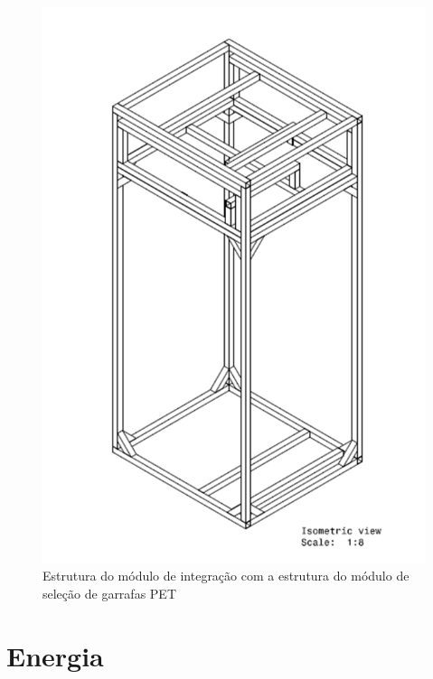 \begin{anexosenv}
\begin{figure}[!ht]
	\centering
		\includegraphics[scale=0.6]{figuras/estrutura/anexos/20.png}
	\caption{Estrutura do módulo de integração com a estrutura do módulo de seleção de garrafas PET}
\end{figure}

\chapter{Energia}


\end{anexosenv}
